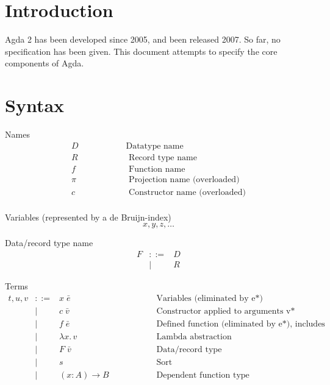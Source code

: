 \documentclass[acmlarge]{acmart}\settopmatter{}
\renewcommand{\|}{|}
\begin{document}
\section{Introduction}

Agda 2 has been developed since 2005, and been released 2007.  So far,
no specification has been given.  This document attempts to specify
the core components of Agda.


\section{Syntax}
\label{sec:syntax}

\newcommand{\bang}{\,!\,}
\newcommand{\twobang}{\,!!\,}


Names
\[
\begin{array}{ll}
D   & \hspace{2cm}\text{Datatype name} \\
  R & \hspace{2cm}\text{   Record type name} \\
  f & \hspace{2cm}\text{   Function name} \\
\pi & \hspace{2cm}\text{  Projection name  (overloaded)} \\
  c & \hspace{2cm}\text{   Constructor name (overloaded)} \\
\end{array}
\]

Variables (represented by a de Bruijn-index)
\[
x,y,z, \hdots
\]

Data/record type name
\[
\begin{array}{lrl}
F &::= & D \\& |& R
\end{array}
\]

Terms
\[
\begin{array}{lrll}
t, u, v &::=& x\; \bar{e}            & \hspace{2cm}\text{Variables (eliminated by e*)} \\
          &|& c\; \bar{v}            & \hspace{2cm}\text{Constructor applied to arguments v*} \\
          &|& f\; \bar{e}            & \hspace{2cm}\text{Defined function (eliminated by e*), includes postulates} \\
          &|& \lambda x.\, v           & \hspace{2cm}\text{Lambda abstraction} \\
          &|& F\; \bar{v}            & \hspace{2cm}\text{Data/record type} \\
          &|& s               & \hspace{2cm}\text{Sort} \\
          &|& (x : A) \rightarrow B      & \hspace{2cm}\text{Dependent function type} \\
\end{array}
\]
\end{document}

